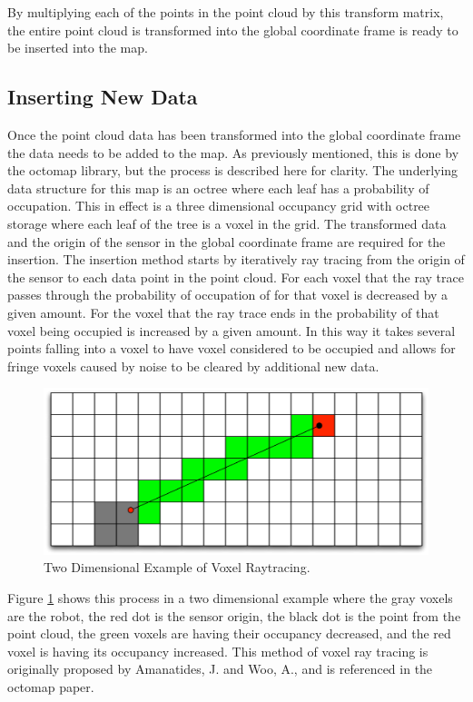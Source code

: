 \documentclass[12pt]{report}
\begin{document}
By multiplying each of the points in the point cloud by this transform matrix, the entire point cloud is transformed into the global coordinate frame is ready to be inserted into the map.

\subsection{Inserting New Data}
Once the point cloud data has been transformed into the global coordinate frame the data needs to be added to the map. As previously mentioned, this is done by the octomap library, but the process is described here for clarity. The underlying data structure for this map is an octree where each leaf has a probability of occupation. This in effect is a three dimensional occupancy grid with octree storage where each leaf of the tree is a voxel in the grid. The transformed data and the origin of the sensor in the global coordinate frame are required for the insertion. The insertion method starts by iteratively ray tracing from the origin of the sensor to each data point in the point cloud.  For each voxel that the ray trace passes through the probability of occupation of for that voxel is decreased by a given amount. For the voxel that the ray trace ends in the probability of that voxel being occupied is increased by a given amount. In this way it takes several points falling into a voxel to have voxel considered to be occupied and allows for fringe voxels caused by noise to be cleared by additional new data.

\begin{figure}[ht]
  \centering
  \includegraphics[width=5in,keepaspectratio]{raytrace.pdf}
  \caption{Two Dimensional Example of Voxel Raytracing.}
  \label{fig:voxel_raytrace}
\end{figure}

Figure \ref{fig:voxel_raytrace} shows this process in a two dimensional example where the gray voxels are the robot, the red dot is the sensor origin, the black dot is the point from the point cloud, the green voxels are having their occupancy decreased, and the red voxel is having its occupancy increased. This method of voxel ray tracing is originally proposed by Amanatides, J. and Woo, A., and is referenced in the octomap paper\cite{amanatides1987fast}.
\end{document}
